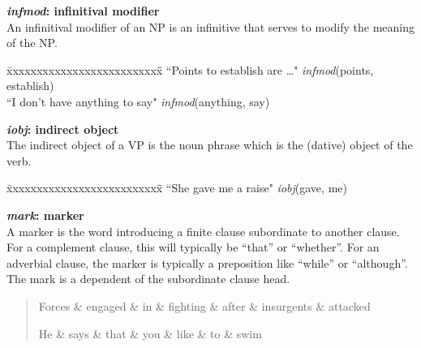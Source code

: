 \documentclass[11pt,letter]{article}
\begin{document}
\noindent\textbf{\emph{infmod}: infinitival modifier}\\
An infinitival modifier of an NP is an infinitive that serves to modify the meaning of the NP.
\begin{tabbing}
\hspace{1cm} \= xxxxxxxxxxxxxxxxxxxxxxxxxx\= \hspace{.5cm}\=  \kill
\>  ``Points to establish are \ldots" \> \> \emph{infmod}(points, establish)\\
\> ``I don't have anything to say" \> \> \emph{infmod}(anything, say)\\
\end{tabbing}

\noindent\textbf{\emph{iobj}: indirect object}\\
The indirect object of a VP is the noun phrase which is the (dative) object of the verb.
\begin{tabbing}
\hspace{1cm} \= xxxxxxxxxxxxxxxxxxxxxxxxxx\= \hspace{.5cm}\=  \kill
 \> ``She gave me a raise" \> \> \emph{iobj}(gave, me)\\
\end{tabbing}

\noindent\textbf{\emph{mark}: marker}\\
A marker is the word introducing a finite clause subordinate to another clause.
For a complement clause, this will typically be ``that'' or ``whether''.
For an adverbial clause, the marker is typically a preposition like ``while'' or ``although''.
The mark is a dependent of the subordinate clause head.
\begin{quote}
\begin{dependency}
   \begin{deptext}[column sep=0.2em]
      Forces \& engaged \& in \& fighting \& after \& insurgents \&  attacked
\\
   \end{deptext}
\end{dependency}

\begin{dependency}
   \begin{deptext}[column sep=0.2em]
      He \& says \& that \& you \& like \& to \& swim
\\
   \end{deptext}
\end{dependency}
\end{quote}
\end{document}
